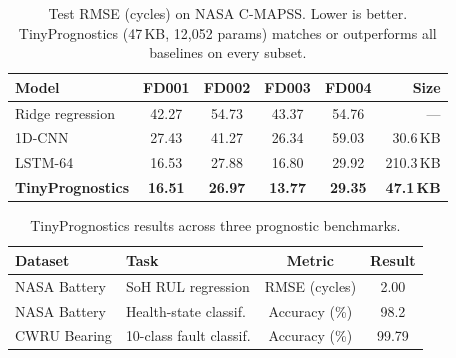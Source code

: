 

\begin{table}[t]
\centering
\caption{Test RMSE (cycles) on NASA C-MAPSS. Lower is better.
TinyPrognostics (47\,KB, 12{,}052 params) matches or outperforms
all baselines on every subset.}
\label{tab:main}
\begin{tabular}{lccccr}
\toprule
Model & FD001 & FD002 & FD003 & FD004 & Size \\
\midrule
Ridge regression        & 42.27 & 54.73 & 43.37 & 54.76 & — \\
1D-CNN                  & 27.43 & 41.27 & 26.34 & 59.03 & 30.6\,KB \\
LSTM-64                 & 16.53 & 27.88 & 16.80 & 29.92 & 210.3\,KB \\
\midrule
\textbf{TinyPrognostics} & \textbf{16.51} & \textbf{26.97} & \textbf{13.77} & \textbf{29.35} & \textbf{47.1\,KB} \\
\bottomrule
\end{tabular}
\end{table}

\begin{table}[t]
\centering
\caption{TinyPrognostics results across three prognostic benchmarks.}
\label{tab:multidataset}
\begin{tabular}{llcc}
\toprule
Dataset & Task & Metric & Result \\
\midrule
NASA Battery & SoH RUL regression     & RMSE (cycles)  & 2.00 \\
NASA Battery & Health-state classif.  & Accuracy (\%)  & 98.2 \\
CWRU Bearing & 10-class fault classif.& Accuracy (\%)  & 99.79 \\
\bottomrule
\end{tabular}
\end{table}

